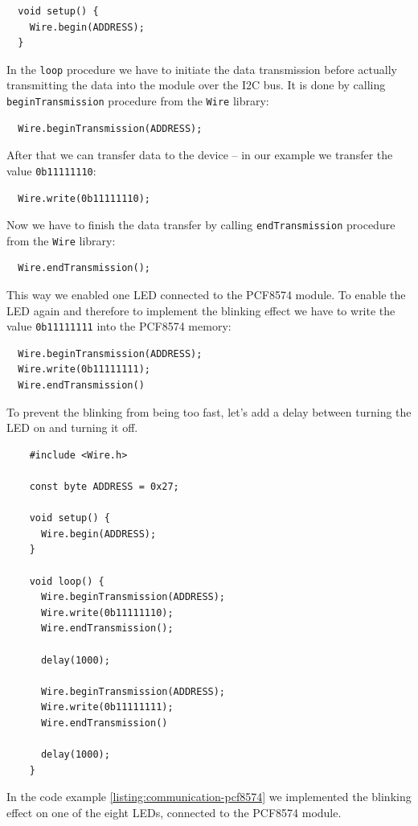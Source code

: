\documentclass[../sparc.tex]{subfiles}
\begin{document}
\begin{verbatim}
  void setup() {
    Wire.begin(ADDRESS);
  }
\end{verbatim}

In the \texttt{loop} procedure we have to initiate the data transmission before
actually transmitting the data into the module over the I2C bus.  It is done by
calling \texttt{beginTransmission} procedure from the \texttt{Wire} library:

\begin{verbatim}
  Wire.beginTransmission(ADDRESS);
\end{verbatim}

After that we can transfer data to the device -- in our example we transfer the
value \texttt{0b11111110}:

\begin{verbatim}
  Wire.write(0b11111110);
\end{verbatim}

Now we have to finish the data transfer by calling \texttt{endTransmission}
procedure from the \texttt{Wire} library:

\begin{verbatim}
  Wire.endTransmission();
\end{verbatim}

This way we enabled one LED connected to the PCF8574 module.  To enable the LED
again and therefore to implement the blinking effect we have to write the value
\texttt{0b11111111} into the PCF8574 memory:

\begin{verbatim}
  Wire.beginTransmission(ADDRESS);
  Wire.write(0b11111111);
  Wire.endTransmission()
\end{verbatim}

To prevent the blinking from being too fast, let's add a delay between turning
the LED on and turning it off.

\begin{listing}[H]
  \begin{verbatim}
    #include <Wire.h>

    const byte ADDRESS = 0x27;

    void setup() {
      Wire.begin(ADDRESS);
    }

    void loop() {
      Wire.beginTransmission(ADDRESS);
      Wire.write(0b11111110);
      Wire.endTransmission();

      delay(1000);

      Wire.beginTransmission(ADDRESS);
      Wire.write(0b11111111);
      Wire.endTransmission()

      delay(1000);
    }
  \end{verbatim}
  \label{listing:communication-pcf8574}
  \caption{An example of LED control through the PCF8574 module and Wire
    library.}
\end{listing}

In the code example \ref{listing:communication-pcf8574} we implemented the
blinking effect on one of the eight LEDs, connected to the PCF8574 module.
\end{document}
